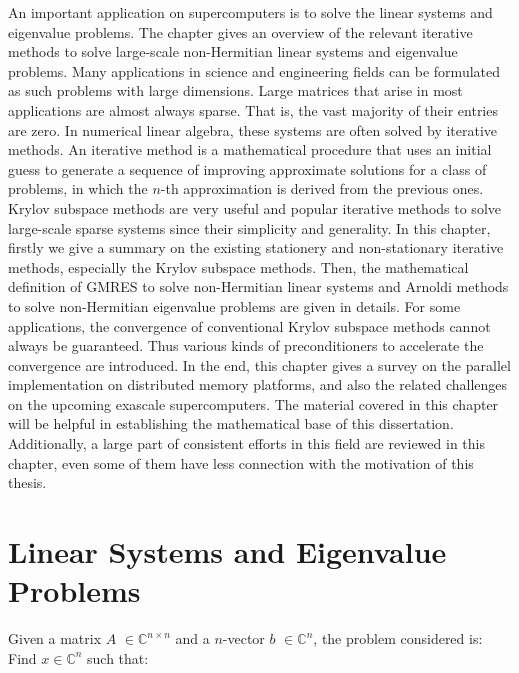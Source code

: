 \begin{displayquote}
	\textsf{An important application on supercomputers is to solve the linear systems and eigenvalue problems. The chapter gives an overview of the relevant iterative methods to solve large-scale non-Hermitian linear systems and eigenvalue problems. Many applications in science and engineering fields can be formulated as such problems with large dimensions.  Large matrices that arise in most applications are almost always sparse. That is, the vast majority of their entries are zero. In numerical linear algebra, these systems are often solved by iterative methods. An iterative method is a mathematical procedure that uses an initial guess to generate a sequence of improving approximate solutions for a class of problems, in which the $n$-th approximation is derived from the previous ones. Krylov subspace methods are very useful and popular iterative methods to solve large-scale sparse systems since their simplicity and generality. In this chapter, firstly we give a summary on the existing stationery and non-stationary iterative methods, especially the Krylov subspace methods. Then, the mathematical definition of GMRES to solve non-Hermitian linear systems and Arnoldi methods to solve non-Hermitian eigenvalue problems are given in details. For some applications, the convergence of conventional Krylov subspace methods cannot always be guaranteed. Thus various kinds of preconditioners to accelerate the convergence are introduced. In the end, this chapter gives a survey on the parallel implementation on distributed memory platforms, and also the related challenges on the upcoming exascale supercomputers. The material covered in this chapter will be helpful in establishing the mathematical base of this dissertation. Additionally, a large part of consistent efforts in this field are reviewed in this chapter, even some of them have less connection with the motivation of this thesis.}
\end{displayquote}

\vspace{0.6in}

\section{Linear Systems and Eigenvalue Problems}

Given a matrix $A$ $\in \mathbb{C}^{n \times n}$ and a $n$-vector $b$ $\in \mathbb{C}^{n}$, the problem considered is: Find $x \in \mathbb{C}^{n}$ such that:

